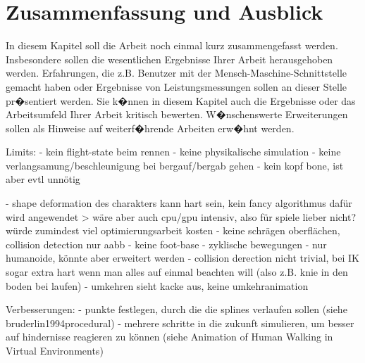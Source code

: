 \chapter{Zusammenfassung und Ausblick}

In diesem Kapitel soll die Arbeit noch einmal kurz zusammengefasst werden. Insbesondere sollen die wesentlichen Ergebnisse Ihrer Arbeit herausgehoben werden. Erfahrungen, die z.B. Benutzer mit der Mensch-Maschine-Schnittstelle gemacht haben oder Ergebnisse von Leistungsmessungen sollen an dieser Stelle pr�sentiert werden. Sie k�nnen in diesem Kapitel auch die Ergebnisse oder das Arbeitsumfeld Ihrer Arbeit kritisch bewerten. W�nschenswerte Erweiterungen sollen als Hinweise auf weiterf�hrende Arbeiten erw�hnt werden.



Limits:
- kein flight-state beim rennen
- keine physikalische simulation
- keine verlangsamung/beschleunigung bei bergauf/bergab gehen
- kein kopf bone, ist aber evtl unnötig

- shape deformation des charakters kann hart sein, kein fancy algorithmus dafür wird angewendet
> wäre aber auch cpu/gpu intensiv, also für spiele lieber nicht? würde zumindest viel optimierungsarbeit kosten
- keine schrägen oberflächen, collision detection nur aabb
- keine foot-base
- zyklische bewegungen
- nur humanoide, könnte aber erweitert werden
- collision derection nicht trivial, bei IK sogar extra hart wenn man alles auf einmal beachten will (also z.B. knie in den boden bei laufen)
- umkehren sieht kacke aus, keine umkehranimation

Verbesserungen:
- punkte festlegen, durch die die splines verlaufen sollen (siehe bruderlin1994procedural)
- mehrere schritte in die zukunft simulieren, um besser auf hindernisse reagieren zu können (siehe Animation of Human Walking in Virtual Environments)